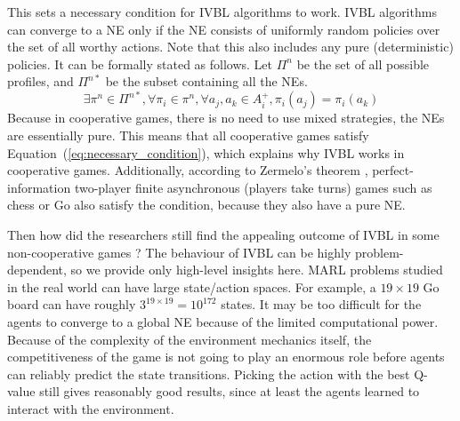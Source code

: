 \documentclass[]{interact}
\theoremstyle{plain}%
\theoremstyle{definition}
\theoremstyle{remark}
\begin{document}
This sets a necessary condition for IVBL algorithms to work. IVBL algorithms can converge to a NE only if the NE consists of uniformly random policies over the set of all worthy actions. Note that this also includes any pure (deterministic) policies. It can be formally stated as follows. Let $\Pi^{n}$ be the set of all possible profiles, and $\Pi^{n*}$ be the subset containing all the NEs.
\begin{equation}
    \exists \pi^n \in \Pi^{n*}, \forall \pi_i \in \pi^n, \forall a_j, a_k \in A^+_i, \pi_i(a_j) = \pi_i(a_k)
    \label{eq:necessary_condition}
\end{equation}
Because in cooperative games, there is no need to use mixed strategies, the NEs are essentially pure. This means that all cooperative games satisfy Equation~(\ref{eq:necessary_condition}), which explains why IVBL works in cooperative games. Additionally, according to Zermelo's theorem \cite{schwalbe2001zermelo}, perfect-information two-player finite asynchronous (players take turns) games such as chess or Go also satisfy the condition, because they also have a pure NE.

Then how did the researchers still find the appealing outcome of IVBL in some non-cooperative games \cite{bjornsson2009cadiaplayer, jiang2018q, kopacz2023evaluating, qu2020distributed}? The behaviour of IVBL can be highly problem-dependent, so we provide only high-level insights here. MARL problems studied in the real world can have large state/action spaces. For example, a $19 \times 19$ Go board can have roughly $3^{19 \times 19} = 10^{172}$ states. It may be too difficult for the agents to converge to a global NE because of the limited computational power. Because of the complexity of the environment mechanics itself, the competitiveness of the game is not going to play an enormous role before agents can reliably predict the state transitions. Picking the action with the best Q-value still gives reasonably good results, since at least the agents learned to interact with the environment.
\end{document}
